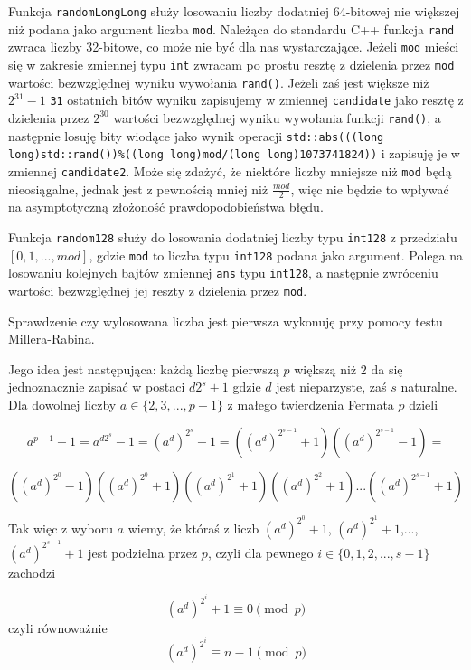 \documentclass{article}
\begin{document}
Funkcja \texttt{randomLongLong} służy losowaniu liczby dodatniej 64-bitowej nie większej niż podana jako argument 
liczba \texttt{mod}. Należąca do standardu C++ funkcja \texttt{rand} zwraca liczby 32-bitowe, co może nie być dla nas
wystarczające. Jeżeli \texttt{mod} mieści się w zakresie zmiennej typu \texttt{int} zwracam po prostu resztę z dzielenia przez \texttt{mod} wartości bezwzględnej
wyniku wywołania \texttt{rand()}. Jeżeli zaś jest większe niż $2^{31}-1$ \texttt{31} ostatnich bitów wyniku zapisujemy w zmiennej \texttt{candidate} jako resztę z dzielenia przez $2^{30}$ wartości bezwzględnej wyniku wywołania funkcji \texttt{rand()},
a następnie losuję bity wiodące jako wynik  operacji \texttt{std::abs(((long long)std::rand())\%((long long)mod/(long long)1073741824))} i zapisuję je w zmiennej \texttt{candidate2}. Może się zdażyć, że niektóre liczby mniejsze niż 
\texttt{mod} będą nieosiągalne, jednak jest z pewnością mniej niż $\frac{mod}{2}$, więc nie będzie to wpływać na 
asymptotyczną złożoność prawdopodobieństwa błędu. 

Funkcja \texttt{random128} służy do losowania dodatniej liczby typu
\texttt{\textunderscore \textunderscore int128} z przedziału $[0,1,...,mod]$, gdzie \texttt{mod}
to liczba typu \texttt{\textunderscore \textunderscore int128} podana jako argument. 
Polega na losowaniu kolejnych bajtów zmiennej \texttt{ans} typu \texttt{\textunderscore \textunderscore int128}, a następnie
zwróceniu wartości bezwzględnej jej reszty z dzielenia przez \texttt{mod}.

Sprawdzenie czy wylosowana liczba jest pierwsza wykonuję przy pomocy testu Millera-Rabina. 

Jego idea jest następująca: każdą liczbę pierwszą $p$ większą niż $2$ da się jednoznacznie zapisać w 
postaci $d2^s+1$
gdzie $d$ jest nieparzyste, zaś $s$ naturalne. Dla dowolnej liczby
$a \in \{2,3,...,p-1\}$ z małego twierdzenia Fermata $p$ dzieli

$$ a^{p-1}-1=a^{d2^s}-1=(a^d)^{2^s}-1=((a^d)^{2^{s-1}}+1)((a^d)^{2^{s-1}}-1)=$$


$$((a^d)^{2^0}-1)((a^d)^{2^0}+1)((a^d)^{2^1}+1)((a^d)^{2^2}+1)...((a^d)^{2^{s-1}}+1) $$

Tak więc z wyboru $a$ wiemy, że któraś z liczb  $(a^d)^{2^0}+1$, $(a^d)^{2^1}+1$,..., $(a^d)^{2^{s-1}}+1$
jest podzielna przez $p$, czyli dla pewnego $i \in \{0,1,2,...,s-1\}$ zachodzi 

$$(a^d)^{2 ^i} + 1\equiv 0 \pmod p$$
czyli równoważnie 
$$(a^d)^{2 ^i} \equiv n-1\pmod p$$
\end{document}
